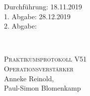 



\begin{titlepage}
  \begin{flushleft}
 Durchführung: 18.11.2019\\
 1. Abgabe: 28.12.2019\\
 2. Abgabe: 
  \end{flushleft}


\HRule\\[1,0cm]

 \begin{center}


\textsc{\LARGE Praktikumsprotokoll V51}\\[1.5cm]
\textsc{\huge Operationsverstärker} \\[5,5cm]

Anneke Reinold\footnotemark[1], \\
Paul-Simon Blomenkamp\footnotemark[2] \\[1,0cm]



 \end{center}
\HRule

 \vfill
\end{titlepage}






\printbibliography


